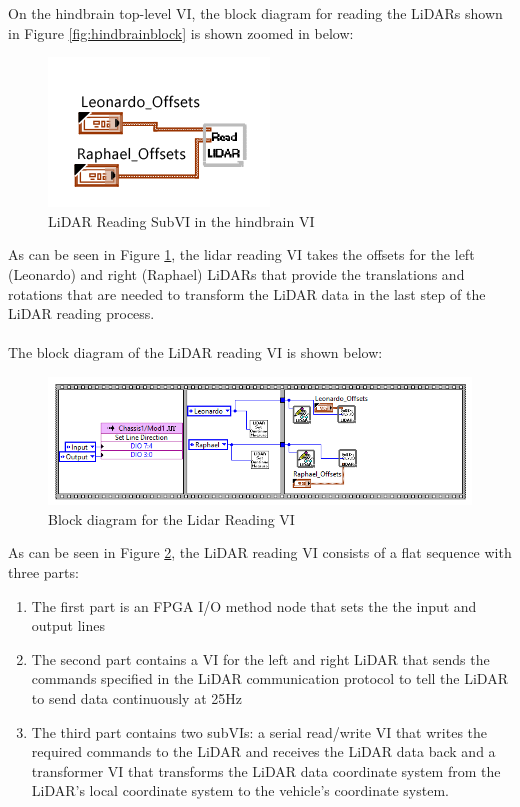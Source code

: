 \noindent On the hindbrain top-level VI, the block diagram for reading the LiDARs shown in Figure \ref{fig:hindbrainblock} is shown zoomed in below:

\begin{figure}[h!]
\centering
\includegraphics[scale=2]{Photos/lidarread.png}
\caption{LiDAR Reading SubVI in the hindbrain VI}
\label{fig:lidarread}
\end{figure}

\noindent As can be seen in Figure \ref{fig:lidarread}, the lidar reading VI takes the offsets for the left (Leonardo) and right (Raphael) LiDARs that provide the translations and rotations that are needed to transform the LiDAR data in the last step of the LiDAR reading process.\\ \\
%
The block diagram of the LiDAR reading VI is shown below:

\begin{figure}[h!]
\centering
\includegraphics[scale=0.75]{Photos/readlidarblock.png}
\caption{Block diagram for the Lidar Reading VI}
\label{fig:readlidarblock}
\end{figure}

\noindent As can be seen in Figure \ref{fig:readlidarblock}, the LiDAR reading VI consists of a flat sequence with three parts:

\begin{enumerate}
\item The first part is an FPGA I/O method node that sets the the input and output lines
\item The second part contains a VI for the left and right LiDAR that sends the commands specified in the LiDAR communication protocol to tell the LiDAR to send data continuously at 25Hz
\item The third part contains two subVIs: a serial read/write VI that writes the required commands to the LiDAR and receives the LiDAR data back and a transformer VI that transforms the LiDAR data coordinate system from the LiDAR's local coordinate system to the vehicle's coordinate system.
\end{enumerate}

